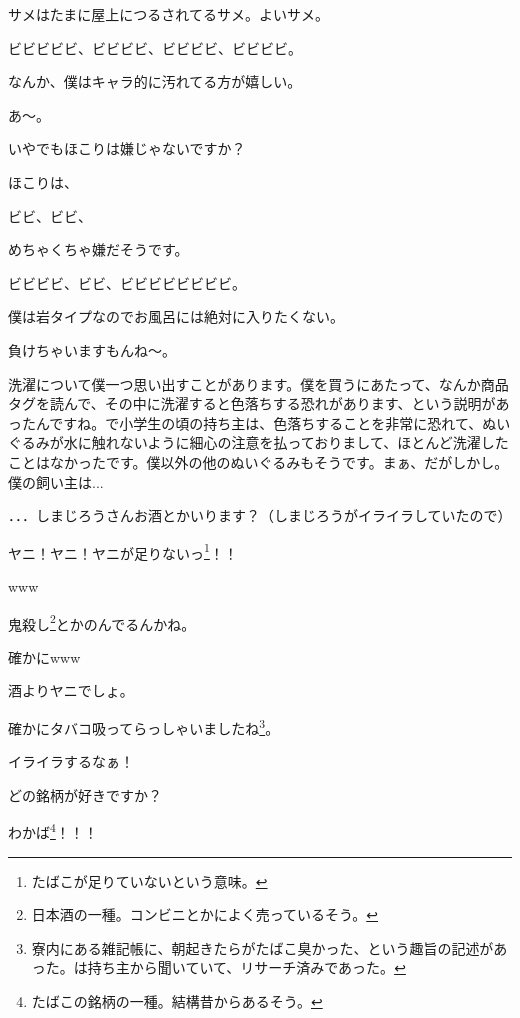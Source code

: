 \documentclass[9pt,4aj]{jsarticle}
\begin{document}
\begin{multicols}{2}
サメはたまに屋上につるされてるサメ。よいサメ。

ビビビビビ、ビビビビ、ビビビビ、ビビビビ。

なんか、僕はキャラ的に汚れてる方が嬉しい。

あ～。

いやでもほこりは嫌じゃないですか？

ほこりは、

ビビ、ビビ、

めちゃくちゃ嫌だそうです。

ビビビビ、ビビ、ビビビビビビビビ。

僕は岩タイプなのでお風呂には絶対に入りたくない。

負けちゃいますもんね～。

洗濯について僕一つ思い出すことがあります。僕を買うにあたって、なんか商品タグを読んで、その中に洗濯すると色落ちする恐れがあります、という説明があったんですね。で小学生の頃の持ち主は、色落ちすることを非常に恐れて、ぬいぐるみが水に触れないように細心の注意を払っておりまして、ほとんど洗濯したことはなかったです。僕以外の他のぬいぐるみもそうです。まぁ、だがしかし。僕の飼い主は...

．．．しまじろうさんお酒とかいります？（しまじろうがイライラしていたので）

{\large ヤニ！ヤニ！ヤニが足りないっ\footnote{たばこが足りていないという意味。}！！}

www

鬼殺し\footnote{日本酒の一種。コンビニとかによく売っているそう。}とかのんでるんかね。

確かにwww

酒よりヤニでしょ。

確かにタバコ吸ってらっしゃいましたね\footnote{寮内にある雑記帳に、朝起きたらがたばこ臭かった、という趣旨の記述があった。は持ち主から聞いていて、リサーチ済みであった。}。

{\large イライラするなぁ！}

どの銘柄が好きですか？

{\large わかば\footnote{たばこの銘柄の一種。結構昔からあるそう。}！！！}


\end{multicols}
\end{document}
